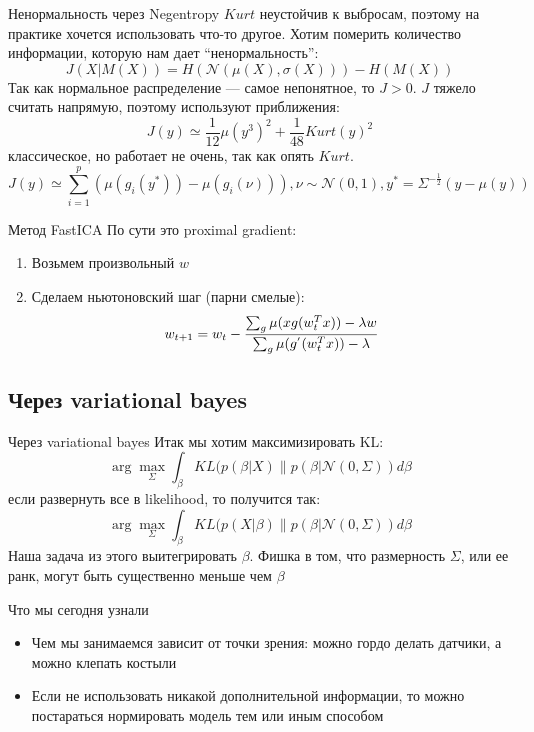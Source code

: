 \documentclass[14pt, fleqn, xcolor={dvipsnames, table}]{beamer}
\begin{document}
\begin{frame}{Ненормальность через Negentropy}
\small
$Kurt$ неустойчив к выбросам, поэтому на практике хочется использовать что-то другое. Хотим померить количество информации, которую нам дает ``ненормальность'':
$$
J(X|M(X)) = H(\mathcal{N}(\mu(X),\sigma(X))) - H(M(X))
$$
Так как нормальное распределение --- самое непонятное, то $J > 0$. $J$ тяжело считать напрямую, поэтому используют приближения:
$$
J(y) \simeq \frac{1}{12}\mu(y^3)^2 + \frac{1}{48}Kurt(y)^2
$$
классическое, но работает не очень, так как опять $Kurt$. 
$$
J(y) \simeq \sum_{i=1}^p (\mu(g_i(y^*)) - \mu(g_i(\nu))), \nu \sim \mathcal{N}(0,1), y^* = \Sigma^{-\frac{1}{2}} (y - \mu(y))
$$
\end{frame}

\begin{frame}{Метод FastICA}
По сути это proximal gradient:
\begin{enumerate}
  \item Возьмем произвольный $w$
  \item Сделаем ньютоновский шаг (парни смелые):
  $$
   w_{t+1} = w_t - {\sum_g \mu (x g(w_t^Tx)) - \lambda w \over \sum_g \mu(g^{'}(w_t^Tx)) - \lambda}
  $$
\end{enumerate}
\end{frame}

\subsection{Через variational bayes}
\begin{frame}{Через variational bayes}
Итак мы хотим максимизировать KL:
$$
\arg \max_\Sigma \int_\beta KL(p(\beta | X) \| p(\beta | \mathcal{N}(0, \Sigma)) d\beta
$$
если развернуть все в likelihood, то получится так:
$$
\arg \max_\Sigma \int_\beta KL(p(X|\beta) \| p(\beta | \mathcal{N}(0, \Sigma)) d\beta
$$
Наша задача из этого выитегрировать $\beta$. Фишка в том, что размерность $\Sigma$, или ее ранк, могут быть существенно меньше чем $\beta$
\end{frame}

\begin{frame}{Что мы сегодня узнали}
\begin{itemize}
  \item Чем мы занимаемся зависит от точки зрения: можно гордо делать датчики, а можно клепать костыли
  \item Если не использовать никакой дополнительной информации, то можно постараться нормировать модель тем или иным способом
\end{itemize}
\end{frame}
\end{document}

